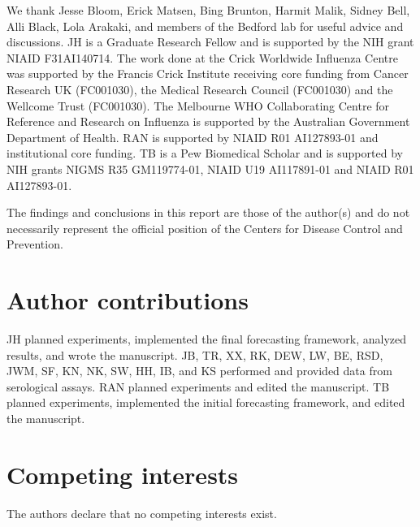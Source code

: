 We thank Jesse Bloom, Erick Matsen, Bing Brunton, Harmit Malik, Sidney Bell, Alli Black, Lola Arakaki, and members of the Bedford lab for useful advice and discussions.
JH is a Graduate Research Fellow and is supported by the NIH grant NIAID F31AI140714.
The work done at the Crick Worldwide Influenza Centre was supported by the Francis Crick Institute receiving core funding from Cancer Research UK (FC001030), the Medical Research Council (FC001030) and the Wellcome Trust (FC001030).
The Melbourne WHO Collaborating Centre for Reference and Research on Influenza is supported by the Australian Government Department of Health.
RAN is supported by NIAID R01 AI127893-01 and institutional core funding.
TB is a Pew Biomedical Scholar and is supported by NIH grants NIGMS R35 GM119774-01, NIAID U19 AI117891-01 and NIAID R01 AI127893-01.

The findings and conclusions in this report are those of the author(s) and do not necessarily represent the official position of the Centers for Disease Control and Prevention.

\section*{Author contributions}

JH planned experiments, implemented the final forecasting framework, analyzed results, and wrote the manuscript.
JB, TR, XX, RK, DEW, LW, BE, RSD, JWM, SF, KN, NK, SW, HH, IB, and KS performed and provided data from serological assays.
RAN planned experiments and edited the manuscript.
TB planned experiments, implemented the initial forecasting framework, and edited the manuscript.

\section*{Competing interests}

The authors declare that no competing interests exist.
